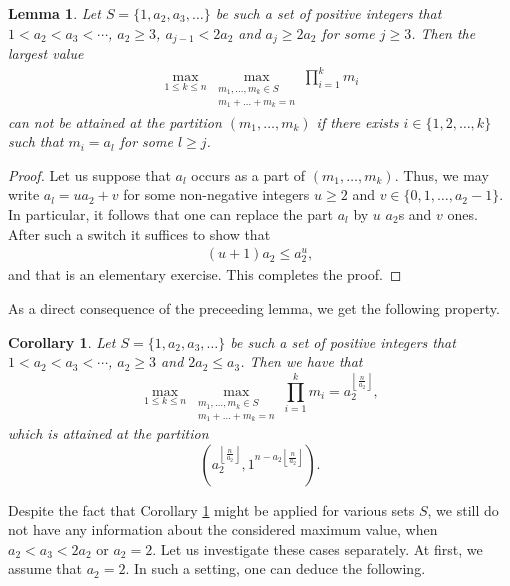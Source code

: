 \documentclass[12pt]{amsart}
\newtheorem{lemma}[theorem]{Lemma}
\newtheorem{corollary}[theorem]{Corollary}
\theoremstyle{definition}
\theoremstyle{remark}
\numberwithin{theorem}{section} \numberwithin{equation}{section}
\newcommand{\floor}[1]{\left\lfloor #1 \right\rfloor}
\begin{document}
\begin{lemma}\label{Lemma: a_2>2 a_j>2a_2}
Let $S=\{1,a_2,a_3,\ldots\}$ be such a set of positive integers that $1<a_2<a_3<\cdots$, $a_2\geq3$, $a_{j-1} < 2a_2$ and $a_j\geq 2a_2$ for some $j\geq3$. Then the largest value
\begin{align*}
\max_{1\leq k\leq n}\max_{\substack{ m_1,\ldots,m_k\in S \\ m_{1}+\ldots +m_{k}=n}}\prod_{i=1}^km_i
\end{align*}
can not be attained at the partition $(m_1,\ldots,m_k)$ if there exists $i\in\{1,2,\ldots,k\}$ such that $m_i=a_l$ for some $l\geq j$.
\end{lemma}
\begin{proof}
Let us suppose that $a_l$ occurs as a part of $(m_1,\ldots,m_k)$. Thus, we
may write $a_l=ua_2+v$ for some non-negative integers $u\geq2$ and
$v\in\{0,1,\ldots,a_2-1\}$. In particular, it follows that one can replace
the part $a_l$ by $u$ $a_2$s and $v$ ones. After such a switch it suffices to show that 
\begin{align*}
(u+1)a_2\leq a_2^u,
\end{align*}
and that is an elementary exercise. This completes the proof.
\end{proof}

As a direct consequence of the preceeding lemma, we get the following property.

\begin{corollary}\label{Corollary: a_2>2 a_3>2a_2}
Let $S=\{1,a_2,a_3,\ldots\}$ be such a set of positive integers that $1<a_2<a_3<\cdots$, $a_2\geq3$ and $2a_2\leq a_3$. Then we have that
\begin{equation*}
\max_{1\leq k\leq n}\max_{\substack{ m_1,\ldots,m_k\in S \\ m_{1}+\ldots +m_{k}=n}}\prod_{i=1}^km_i=a_2^{\floor{\frac{n}{a_2}}},
\end{equation*}
which is attained at the partition
\begin{equation*}
(a_2^{\floor{\frac{n}{a_2}}},1^{n-a_2\floor{\frac{n}{a_2}}}).
\end{equation*}
\end{corollary}

Despite the fact that Corollary \ref{Corollary: a_2>2 a_3>2a_2} might be
applied for various sets $S$, we still do not have any information about the
considered maximum value, when $
a_2<a_3<2a_2$ or $a_2=2$. Let us investigate these cases separately. At first, we assume that $a_2=2$. In such a setting, one can deduce the following.
\end{document}
